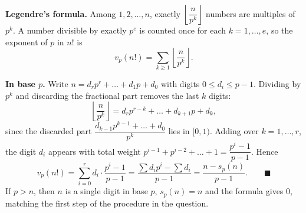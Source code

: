 \textbf{Legendre's formula.} Among $1,2,\dots,n$, exactly $\left\lfloor\dfrac{n}{p^k}\right\rfloor$ numbers are multiples of $p^k$. A number divisible by exactly $p^e$ is counted once for each $k=1,\dots,e$, so the exponent of $p$ in $n!$ is
\[
v_p(n!)=\sum_{k\ge1}\left\lfloor\dfrac{n}{p^k}\right\rfloor .
\]

\textbf{In base $p$.} Write $n=d_rp^r+\dots+d_1p+d_0$ with digits $0\le d_i\le p-1$. Dividing by $p^k$ and discarding the fractional part removes the last $k$ digits:
\[
\left\lfloor\dfrac{n}{p^k}\right\rfloor=d_rp^{r-k}+\dots+d_{k+1}p+d_k ,
\]
since the discarded part $\dfrac{d_{k-1}p^{k-1}+\dots+d_0}{p^k}$ lies in $[0,1)$. Adding over $k=1,\dots,r$, the digit $d_i$ appears with total weight $p^{i-1}+p^{i-2}+\dots+1=\dfrac{p^i-1}{p-1}$. Hence
\[
v_p(n!)=\sum_{i=0}^{r}d_i\cdot\dfrac{p^i-1}{p-1}=\dfrac{\sum d_ip^i-\sum d_i}{p-1}=\dfrac{n-s_p(n)}{p-1}.\qquad\blacksquare
\]
If $p>n$, then $n$ is a single digit in base $p$, $s_p(n)=n$ and the formula gives $0$, matching the first step of the procedure in the question.
